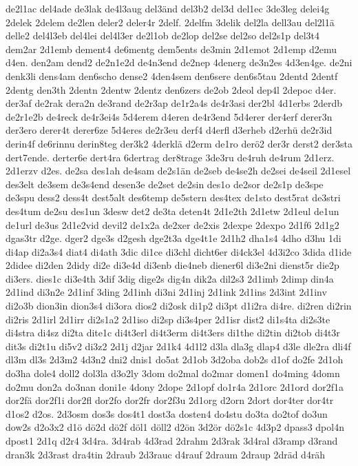{de2l1ac
del4ade
de3lak
de4l3aug
del3änd
del3b2
del3d
del1ec
3de3leg
delei4g
2delek
2delem
de2len
deler2
deler4r
2delf.
2delfm
3delik
del2la
dell3au
del2l1ä
delle2
del4l3eb
del4lei
del4l3er
de2l1ob
de2lop
del2se
del2so
del2s1p
del3t4
dem2ar
2d1emb
dement4
de6mentg
dem5ents
de3min
2d1emot
2d1emp
d2emu
d4en.
den2am
dend2
de2n1e2d
de4n3end
de2nep
4denerg
de3n2es
4d3en4ge.
de2ni
denk3li
dens4am
den6scho
dense2
4den4sem
den6sere
den6s5tau
2dentd
2dentf
2dentg
den3th
2dentn
2dentw
2dentz
den6zers
de2ob
2deol
dep4l
2depoc
d4er.
der3af
de2rak
dera2n
de3rand
de2r3ap
de1r2a4s
de4r3asi
der2bl
4d1erbs
2derdb
de2r1e2b
de4reck
de4r3ei4s
5d4erem
d4eren
de4r3end
5d4erer
der4erf
derer3n
der3ero
derer4t
derer6ze
5d4eres
de2r3eu
derf4
d4erfl
d3erheb
d2erhü
de2r3id
derin4f
de6rinnu
derin8teg
der3k2
4derklä
d2erm
de1ro
derö2
der3r
derst2
der3sta
dert7ende.
derter6e
dert4ra
6dertrag
der8trage
3de3ru
de4ruh
de4rum
2d1erz.
2d1erzv
d2es.
de2sa
des1ah
de4sam
de2s1än
de2seb
de4se2h
de2sei
de4seil
2d1esel
des3elt
de3sem
de3s4end
desen3e
de2set
de2sin
des1o
de2sor
de2s1p
de3spe
de3spu
dess2
dess4t
dest5alt
des6temp
de5stern
des4tex
de1sto
dest5rat
de3stri
des4tum
de2su
des1un
3desw
det2
de3ta
deten4t
2d1e2th
2d1etw
2d1eul
de1un
de1url
de3us
2d1e2vid
devil2
de1x2a
de2xer
de2xis
2dexpe
2dexpo
2d1f6
2d1g2
dgas3tr
d2ge.
dger2
dge3s
d2gesh
dge2t3a
dge4t1e
2d1h2
dha1s4
4dho
d3hu
1di
di4ap
di2a3s4
diat4
di4ath
3dic
di1ce
di3chl
dicht6er
di4ck3el
4d3i2co
3dida
d1ide
2didee
di2den
2didy
di2e
di3e4d
di3enb
die4neb
diener6l
di3e2ni
dienst5r
die2p
di3ers.
dies1c
di3e4th
3dif
3dig
dige2s
dig4n
dik2a
dil2s3
2d1imb
2dimp
din4a
2d1ind
di3n2e
2d1inf
3ding
2d1inh
di3ni
2d1inj
2d1ink
2d1ins
2d3int
2d1inv
di2o3b
dion3in
dion3s4
di3ora
dios2
di2osk
di1p2
di3pt
d1i2ra
di4re.
di2ren
di2rin
di2ris
2d1irl
2d1irr
di2s1a2
2d1iso
di2sp
di3s4per
2d1isr
dist2
di1s4ta
di2s3te
di4stra
di4sz
di2ta
dite1c
di4t3erl
di4t3erm
di4t3ers
di1the
di2tin
di2tob
di4t3r
dit3s
di2t1u
di5v2
di3z2
2d1j
d2jar
2d1k4
4d1l2
d3la
dla3g
dlap4
d3le
dle2ra
dli4f
dl3m
dl3s
2d3m2
4d3n2
dni2
dnis1
do5at
2d1ob
3d2oba
dob2s
d1of
do2fe
2d1oh
do3ha
dole4
doll2
dol3la
d3o2ly
3dom
do2mal
do2mar
domen1
do4ming
4domn
do2mu
don2a
do3nan
doni1e
4dony
2dope
2d1opf
do1r4a
2d1orc
2d1ord
dor2f1a
dor2fä
dor2f1i
dor2fl
dor2fo
dor2fr
dor2f3u
2d1org
d2orn
2dort
dor4ter
dor4tr
d1os2
d2os.
2d3osm
dos3s
dos4t1
dost3a
dosten4
do4stu
do3ta
do2tof
do3un
dow2s
d2o3x2
d1ö
dö2d
dö2f
döl1
döll2
d2ön
3d2ör
dö2s1c
4d3p2
dpass3
dpol4n
dpost1
2d1q
d2r4
3d4ra.
3d4rab
4d3rad
2drahm
2d3rak
3d4ral
d3ramp
d3rand
dran3k
2d3rast
dra4tin
2draub
2d3rauc
d4rauf
2draum
2draup
2dräd
d4räh
}
